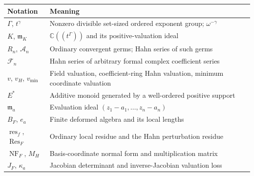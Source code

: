 \documentclass[11pt,letterpaper]{article}
\theoremstyle{definition}
\theoremstyle{remark}
\newcommand{\C}{\mathbb C}
\newcommand{\A}{\mathscr A}
\newcommand{\m}{\mathfrak m}
\newcommand{\Res}{\operatorname{Res}}
\newcommand{\res}{\operatorname{res}}
\newcommand{\NF}{\operatorname{NF}}
\newcommand{\vH}{v_{\!H}}
\newcommand{\vmin}{v_{\min}}
\numberwithin{equation}{section}
\begin{document}
\begin{center}\small
\begin{tabular}{@{}L{0.27\textwidth}L{0.64\textwidth}@{}}
\toprule
Notation & Meaning\\
\midrule
$\Gamma$, $t^\gamma$ & Nonzero divisible set-sized ordered exponent group; $\omega^{-\gamma}$\\[0.35em]
$K$, $\m_K$ & $\C((t^\Gamma))$ and its positive-valuation ideal\\[0.35em]
$R_n$, $\A_n$ & Ordinary convergent germs; Hahn series of such germs\\[0.35em]
$\mathscr F_n$ & Hahn series of arbitrary formal complex coefficient series\\[0.35em]
$v$, $\vH$, $\vmin$ & Field valuation, coefficient-ring Hahn valuation, minimum coordinate valuation\\[0.35em]
$E^*$ & Additive monoid generated by a well-ordered positive support\\[0.35em]
$\m_a$ & Evaluation ideal $(z_1-a_1,\ldots,z_n-a_n)$\\[0.35em]
$B_F$, $e_a$ & Finite deformed algebra and its local lengths\\[0.35em]
$\res_f$, $\Res_F$ & Ordinary local residue and the Hahn perturbation residue\\[0.35em]
$\NF_F$, $M_H$ & Basis-coordinate normal form and multiplication matrix\\[0.35em]
$J_F$, $\kappa_a$ & Jacobian determinant and inverse-Jacobian valuation loss\\
\bottomrule
\end{tabular}
\end{center}
\end{document}
